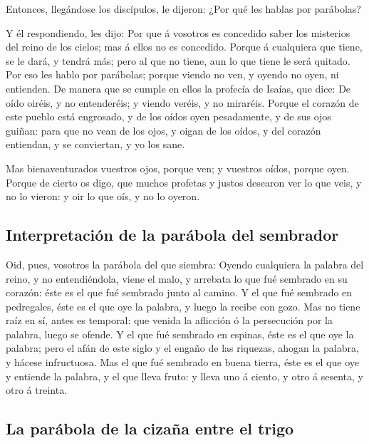  Entonces, llegándose los discípulos, le dijeron: ¿Por
qué les hablas por parábolas?

 Y él respondiendo, les dijo: Por que á vosotros es
concedido saber los misterios del reino de los cielos; mas á ellos no es
concedido.  Porque á cualquiera que tiene, se le dará, y
tendrá más; pero al que no tiene, aun lo que tiene le será quitado.
 Por eso les hablo por parábolas; porque viendo no ven, y
oyendo no oyen, ni entienden.  De manera que se cumple en
ellos la profecía de Isaías, que dice: De oído oiréis, y no entenderéis;
y viendo veréis, y no miraréis.  Porque el corazón de
este pueblo está engrosado, y de los oídos oyen pesadamente, y de sus
ojos guiñan: para que no vean de los ojos, y oigan de los oídos, y del
corazón entiendan, y se conviertan, y yo los sane.

 Mas bienaventurados vuestros ojos, porque ven; y
vuestros oídos, porque oyen.  Porque de cierto os digo,
que muchos profetas y justos desearon ver lo que veis, y no lo vieron: y
oir lo que oís, y no lo oyeron.

\hypertarget{interpretaciuxf3n-de-la-paruxe1bola-del-sembrador}{%
\subsection{Interpretación de la parábola del
sembrador}\label{interpretaciuxf3n-de-la-paruxe1bola-del-sembrador}}

 Oid, pues, vosotros la parábola del que siembra:
 Oyendo cualquiera la palabra del reino, y no
entendiéndola, viene el malo, y arrebata lo que fué sembrado en su
corazón: éste es el que fué sembrado junto al camino.  Y
el que fué sembrado en pedregales, éste es el que oye la palabra, y
luego la recibe con gozo.  Mas no tiene raíz en sí, antes
es temporal: que venida la aflicción ó la persecución por la palabra,
luego se ofende.  Y el que fué sembrado en espinas, éste
es el que oye la palabra; pero el afán de este siglo y el engaño de las
riquezas, ahogan la palabra, y hácese infructuosa.  Mas
el que fué sembrado en buena tierra, éste es el que oye y entiende la
palabra, y el que lleva fruto: y lleva uno á ciento, y otro á sesenta, y
otro á treinta.

\hypertarget{la-paruxe1bola-de-la-cizauxf1a-entre-el-trigo}{%
\subsection{La parábola de la cizaña entre el
trigo}\label{la-paruxe1bola-de-la-cizauxf1a-entre-el-trigo}}

